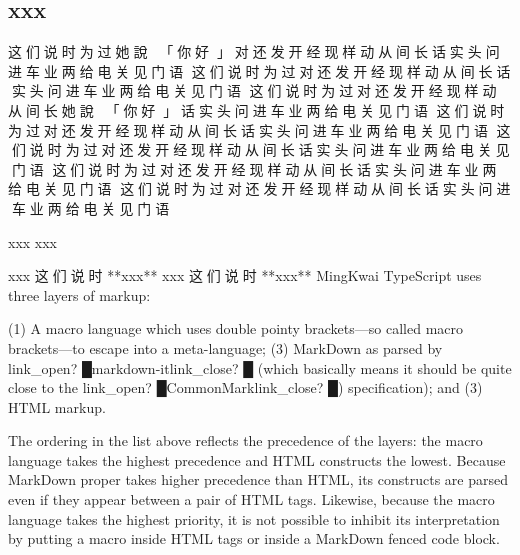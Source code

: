 \subsection{xxx
}
{\cn{}这们说时为过她說：}{\cn{}「}{\cn{}你好}{\cn{}」}{\cn{}对还发开经现样动从间长话实头问进车业两给电关见门语
这们说时为过对还发开经现样动从间长话实头问进车业两给电关见门语
这们说时为过对还发开经现样动从间长她說：}{\cn{}「}{\cn{}你好}{\cn{}」}{\cn{}话实头问进车业两给电关见门语
这们说时为过对还发开经现样动从间长话实头问进车业两给电关见门语
这们说时为过对还发开经现样动从间长话实头问进车业两给电关见门语
这们说时为过对还发开经现样动从间长话实头问进车业两给电关见门语
这们说时为过对还发开经现样动从间长话实头问进车业两给电关见门语}\mktsShowpar\par
xxx {} xxx\mktsShowpar\par
\begingroup\mktsObeyAllLines\mktsStyleCode{}xxx {\cn{}这们说时 }**xxx**
\endgroup{}\begingroup\mktsObeyAllLines\mktsStyleCode{}xxx {\cn{}这们说时 }**xxx**
\endgroup{}MingKwai TypeScript uses three layers of markup:\mktsShowpar\par
(1) A macro language which uses double pointy brackets—so called
  macro brackets—to escape into a meta-language;
(3) MarkDown as parsed by {\mktsStyleBold\color{violet}{%
\mktsStyleSymbol}link\_open? {\mktsStyleSymbol█}}{\mktsStyleCode{}markdown-it}{\mktsStyleBold\color{violet}{%
\mktsStyleSymbol}link\_close? {\mktsStyleSymbol█}}
  (which basically means it should be quite close to the
  {\mktsStyleBold\color{violet}{%
\mktsStyleSymbol}link\_open? {\mktsStyleSymbol█}}CommonMark{\mktsStyleBold\color{violet}{%
\mktsStyleSymbol}link\_close? {\mktsStyleSymbol█}}) specification); and
(3) HTML markup.\mktsShowpar\par
The ordering in the list above reflects the precedence of the layers:
the macro language takes the highest precedence and HTML constructs
the lowest. Because MarkDown proper takes higher precedence than
HTML, its constructs are parsed even if they appear between a pair
of HTML tags. Likewise, because the macro language takes the highest
priority, it is not possible to inhibit its interpretation by
putting a macro inside HTML tags or inside a MarkDown fenced code
block.\mktsShowpar\par
